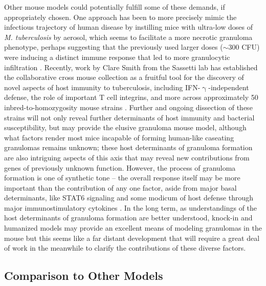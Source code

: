 Other mouse models could potentially fulfill some of these demands, if appropriately chosen. One approach has been to more precisely mimic the infectious trajectory of human disease by instilling mice with ultra-low doses of \textit{M. tuberculosis} by aerosol, which seems to facilitate a more necrotic granuloma phenotype, perhaps suggesting that the previously used larger doses (${\sim}$300 CFU) were inducing a distinct immune response that led to more granulocytic infiltration \citep{Plumlee2021}. Recently, work by Clare Smith from the Sassetti lab has established the collaborative cross mouse collection as a fruitful tool for the discovery of novel aspects of host immunity to tuberculosis, including IFN-$\upgamma$-independent defense, the role of important T cell integrins, and more across approximately 50 inbred-to-homozygosity mouse strains \citep{Smith2016, Smith2022}. Further and ongoing dissection of these strains will not only reveal further determinants of host immunity and bacterial susceptibility, but may provide the elusive granuloma mouse model, although what factors render most mice incapable of forming human-like caseating granulomas remains unknown; these host determinants of granuloma formation are also intriguing aspects of this axis that may reveal new contributions from genes of previously unknown function. However, the process of granuloma formation is one of synthetic tone -- the overall response itself may be more important than the contribution of any one factor, aside from major basal determinants, like STAT6 signaling \citep{Cronan2021} and some modicum of host defense through major immunostimulatory cytokines \citep{Flynn1993, Flynn1995}. In the long term, as understandings of the host determinants of granuloma formation are better understood, knock-in and humanized models may provide an excellent means of modeling granulomas in the mouse but this seems like a far distant development that will require a great deal of work in the meanwhile to clarify the contributions of these diverse factors.

\subsection{Comparison to Other Models}\label{zfcomp}

